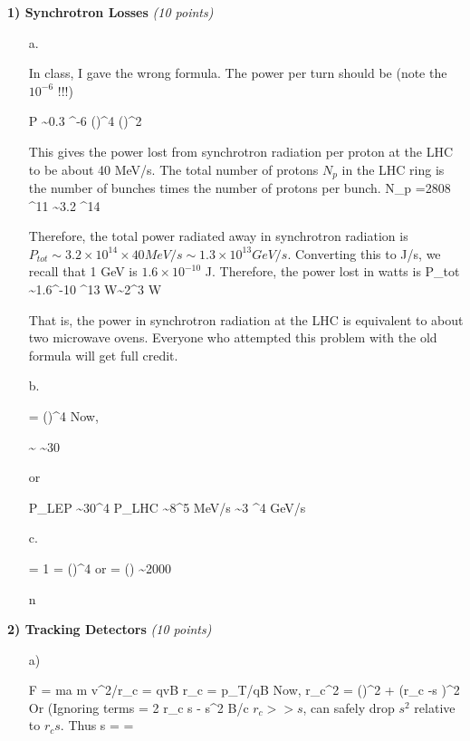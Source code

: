 {\large

\textbf{1) Synchrotron Losses } \hfill \textit{(10 points)}\\

\begin{itemize}
\item[a.]{ 
In class,  I gave the wrong formula.  The power per turn should be (note the \textbf{$10^{-6}$} !!!)

\be
P \sim 0.3 ^{-6} \left(\right)^4 \left(\right)^2
\ee

This gives the power lost from synchrotron radiation per proton at the LHC to be about 40 MeV/s. 
The total number of protons $N_p$ in the LHC ring is the number of bunches times the number of protons per bunch.
\be
N_p =2808  ^{11} \sim 3.2 ^{14}
\ee

Therefore, the total power radiated away in synchrotron radiation is $P_{tot} \sim 3.2 \times 10^{14} \times 40 MeV/s \sim 1.3\times 10^{13} GeV/s$.
Converting this to J/s, we recall that 1 GeV is $1.6 \times 10^{-10}$ J. Therefore, the power lost in watts is
\be
P_{tot} \sim 1.6^{-10} ^{13} W\sim 2^3 W
\ee

That is, the power in synchrotron radiation at the LHC is equivalent to about two microwave ovens.
Everyone who attempted this problem with the old formula will get full credit.

}
\item[b.]{
\be
{} = \left(\right)^4
\ee
Now, 

\be
{} \sim {} \sim 30
\ee

or 

\be
P_{LEP} \sim 30^4 P_{LHC} \sim 8^5  MeV/s \sim 3 ^4 GeV/s 
\ee

}
\item[c.]{
\be
{} = 1 = \left(\right)^4 
\ee
or 
\be
{}  = \left(\right) \sim 2000
\ee

}n

\end{itemize}

\vspace*{0.25in}

\textbf{2) Tracking Detectors } \hfill \textit{(10 points)}\\
\begin{itemize}
\item[a)]{
\be
F = ma \Rightarrow m v^2/r_c = qvB  \Rightarrow r_c = p_T/qB
\ee
Now,
\be
r_c^2 = \left(\right)^2 + (r_c -s )^2
\ee
Or (Ignoring terms 
\be
{} = 2 r_c s - s^2
\ee
B/c $r_c >> s$, can safely drop $s^2$ relative to $r_c s$.  Thus
\be
s =  = 
\ee


}
\end{itemize}}

